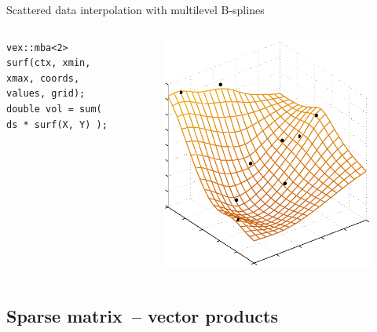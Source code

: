 \documentclass[@BEAMER_OPTIONS@]{beamer}
\begin{document}
\begin{frame}[fragile]{Scattered data interpolation with multilevel B-splines}
\begin{columns}
\begin{column}{0.6\textwidth}
\begin{exampleblock}{}
\begin{lstlisting}
vex::mba<2> surf(ctx, xmin, xmax, coords, values, grid);
double vol = sum( ds * surf(X, Y) );
                \end{lstlisting}
            \end{exampleblock}
        \end{column}
        \begin{column}{0.333\textwidth}
            \begin{figure}
                \includegraphics[width=\textwidth]{mba}
            \end{figure}
        \end{column}
    \end{columns}
\end{frame}

\note{ }

\subsection{Sparse matrix~-- vector products}
\end{document}
